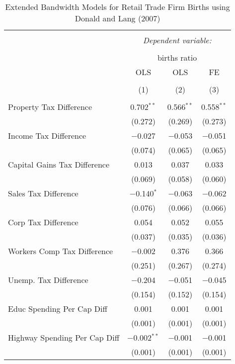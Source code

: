
\begin{table}[!htbp] \centering 
  \caption{Extended Bandwidth Models for  Retail Trade Firm Births using Donald and Lang (2007)} 
  \label{} 
\begin{tabular}{@{\extracolsep{5pt}}lccc} 
\\[-1.8ex]\hline 
\hline \\[-1.8ex] 
 & \multicolumn{3}{c}{\textit{Dependent variable:}} \\ 
\cline{2-4} 
\\[-1.8ex] & \multicolumn{3}{c}{births ratio} \\ 
 & OLS & OLS & FE \\ 
\\[-1.8ex] & (1) & (2) & (3)\\ 
\hline \\[-1.8ex] 
 Property Tax Difference & 0.702$^{**}$ & 0.566$^{**}$ & 0.558$^{**}$ \\ 
  & (0.272) & (0.269) & (0.273) \\ 
  Income Tax Difference & $-$0.027 & $-$0.053 & $-$0.051 \\ 
  & (0.074) & (0.065) & (0.065) \\ 
  Capital Gains Tax Difference & 0.013 & 0.037 & 0.033 \\ 
  & (0.069) & (0.058) & (0.060) \\ 
  Sales Tax Difference & $-$0.140$^{*}$ & $-$0.063 & $-$0.062 \\ 
  & (0.076) & (0.066) & (0.066) \\ 
  Corp Tax Difference & 0.054 & 0.052 & 0.055 \\ 
  & (0.037) & (0.035) & (0.036) \\ 
  Workers Comp Tax Difference & $-$0.002 & 0.376 & 0.366 \\ 
  & (0.251) & (0.267) & (0.274) \\ 
  Unemp. Tax Difference & $-$0.204 & $-$0.051 & $-$0.045 \\ 
  & (0.154) & (0.152) & (0.154) \\ 
  Educ Spending Per Cap Diff & 0.001 & 0.001 & 0.001 \\ 
  & (0.001) & (0.001) & (0.001) \\ 
  Highway Spending Per Cap Diff & $-$0.002$^{**}$ & $-$0.001 & $-$0.001 \\ 
  & (0.001) & (0.001) & (0.001) \\ 

\end{tabular}
\end{table}
